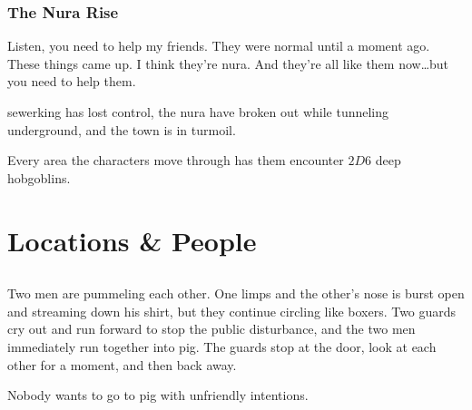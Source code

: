 \subsubsection{The Nura Rise}

\begin{speechtext}
	Listen, you need to help my friends.  They were normal until a moment ago.  These things came up.  I think they're nura.  And they're all like them now\ldots but you need to help them.
\end{speechtext}

\gls{sewerking} has lost control, the nura have broken out while tunneling underground, and the town is in turmoil.

Every area the characters move through has them encounter $2D6$ deep hobgoblins.

\deephobgoblin


\section{Locations \& People}


\label{town_map}



\subsection{}

\begin{boxtext}
	Two men are pummeling each other.  One limps and the other's nose is burst open and streaming down his shirt, but they continue circling like boxers.  Two guards cry out and run forward to stop the public disturbance, and the two men immediately run together into \gls{pig}.  The guards stop at the door, look at each other for a moment, and then back away.

	Nobody wants to go to \gls{pig} with unfriendly intentions.

\end{boxtext}

 


\label{mincing_pig_map}


